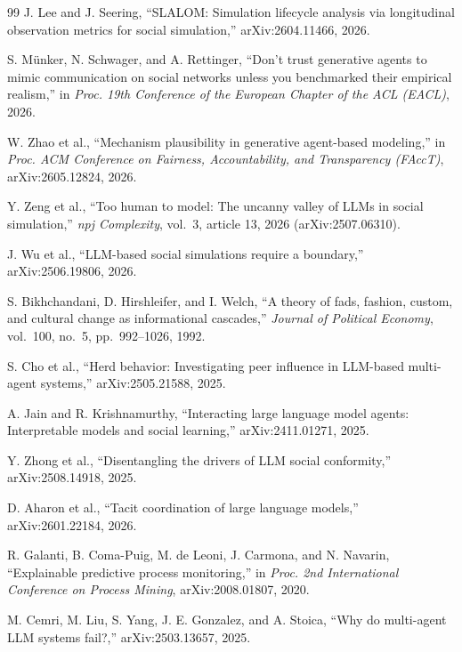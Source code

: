 \documentclass[11pt]{article}
\begin{document}
\begin{thebibliography}{99}
J. Lee and J. Seering, ``SLALOM: Simulation lifecycle analysis via longitudinal observation metrics for social simulation,'' arXiv:2604.11466, 2026.

S. M\"{u}nker, N. Schwager, and A. Rettinger, ``Don't trust generative agents to mimic communication on social networks unless you benchmarked their empirical realism,'' in \emph{Proc. 19th Conference of the European Chapter of the ACL (EACL)}, 2026.

W. Zhao et al., ``Mechanism plausibility in generative agent-based modeling,'' in \emph{Proc. ACM Conference on Fairness, Accountability, and Transparency (FAccT)}, arXiv:2605.12824, 2026.

Y. Zeng et al., ``Too human to model: The uncanny valley of LLMs in social simulation,'' \emph{npj Complexity}, vol.\ 3, article 13, 2026 (arXiv:2507.06310).

J. Wu et al., ``LLM-based social simulations require a boundary,'' arXiv:2506.19806, 2026.

S. Bikhchandani, D. Hirshleifer, and I. Welch, ``A theory of fads, fashion, custom, and cultural change as informational cascades,'' \emph{Journal of Political Economy}, vol.\ 100, no.\ 5, pp.\ 992--1026, 1992.

S. Cho et al., ``Herd behavior: Investigating peer influence in LLM-based multi-agent systems,'' arXiv:2505.21588, 2025.

A. Jain and R. Krishnamurthy, ``Interacting large language model agents: Interpretable models and social learning,'' arXiv:2411.01271, 2025.

Y. Zhong et al., ``Disentangling the drivers of LLM social conformity,'' arXiv:2508.14918, 2025.

D. Aharon et al., ``Tacit coordination of large language models,'' arXiv:2601.22184, 2026.

R. Galanti, B. Coma-Puig, M. de Leoni, J. Carmona, and N. Navarin, ``Explainable predictive process monitoring,'' in \emph{Proc. 2nd International Conference on Process Mining}, arXiv:2008.01807, 2020.

M. Cemri, M. Liu, S. Yang, J. E. Gonzalez, and A. Stoica, ``Why do multi-agent LLM systems fail?,'' arXiv:2503.13657, 2025.


\end{thebibliography}
\end{document}
